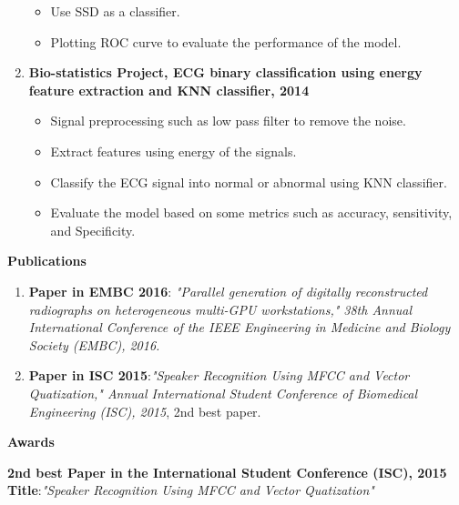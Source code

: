 \documentclass[a4paper,12pt,final]{memoir}
\newcommand{\Sep}{\vspace{1.5em}}
\newcommand{\SmallSep}{\vspace{0.5em}}
\newcommand{\CVSection}[1]
	{\Large\textbf{#1}\par
	\SmallSep\normalsize\normalfont}
\newcommand{\CVItem}[1]
	{\textbf{\color{RoyalBlue} #1}}
\begin{document}
\begin{enumerate}
\begin{itemize}
\item Use SSD as a classifier.
\item Plotting ROC curve to evaluate the performance of the model.
\end{itemize}
\item \textbf{Bio-statistics Project, ECG binary classification using energy feature extraction and KNN classifier, 2014}
\begin{itemize}
\item Signal preprocessing such as low pass filter to remove the noise.
\item  Extract features using energy of the signals.
\item Classify the ECG signal into normal or abnormal using KNN classifier.
\item Evaluate the model based on some metrics such as accuracy, sensitivity, and Specificity.
\end{itemize}
\end{enumerate}


\Sep

\clearpage
\framebreak
\framebreak


\CVSection{Publications}
\begin{enumerate}
\item \CVItem{Paper in EMBC 2016}:\textit{ "Parallel generation of digitally reconstructed radiographs on heterogeneous multi-GPU workstations," 38th Annual International Conference of the IEEE Engineering in Medicine and Biology Society (EMBC), 2016.}
\item \CVItem{Paper in ISC 2015}:\textit{"Speaker Recognition Using MFCC and Vector Quatization," Annual International Student Conference of Biomedical Engineering (ISC), 2015}, 2nd best paper.
\end{enumerate}
\Sep

\CVSection{Awards}
\CVItem{2nd best Paper in the International Student Conference (ISC), 2015}
\textbf{Title}:\textit{"Speaker Recognition Using MFCC and Vector Quatization"}\newline
\Sep
\end{document}
